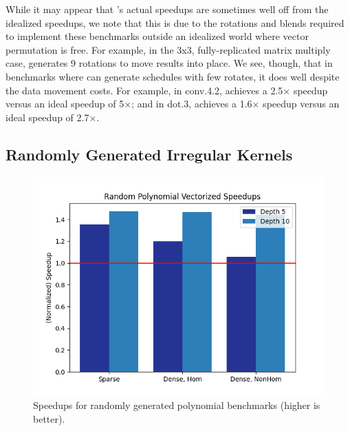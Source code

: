 While it may appear that \system's actual speedups are sometimes well off from the idealized speedups, we note that this is due to the rotations and blends required to implement these benchmarks outside an idealized world where vector permutation is free. For example, in the \textsf{3x3}, fully-replicated matrix multiply case, \system generates 9 rotations to move results into place. We see, though, that in benchmarks where \system can generate schedules with few rotates, it does well despite the data movement costs. For example, in \textsf{conv.4.2}, \system achieves a 2.5$\times$ speedup versus an ideal speedup of 5$\times$; and in \textsf{dot.3}, \system achieves a 1.6$\times$ speedup versus an ideal speedup of 2.7$\times$.


\subsection{Randomly Generated Irregular Kernels}
\begin{figure}
    \includegraphics[width=0.7\linewidth]{figures/graphs/trees.png}
    \caption{Speedups for randomly generated polynomial benchmarks (higher is better).}\label{fig:polynomial-speedups}
\end{figure}

